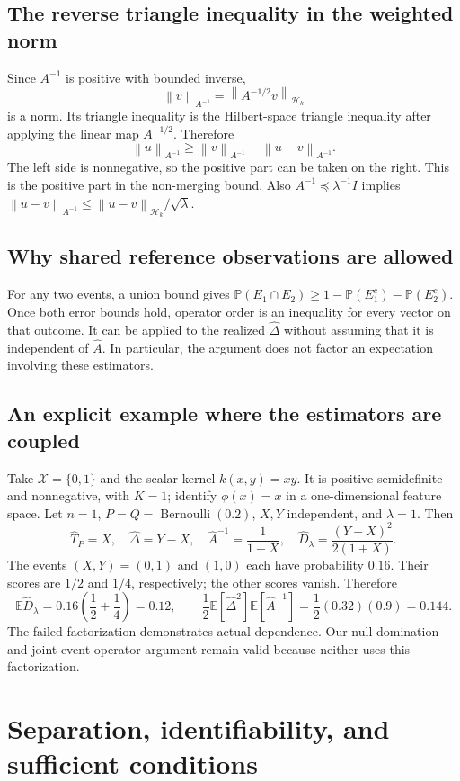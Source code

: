 \documentclass[11pt,a4paper]{article}
\theoremstyle{definition}
\theoremstyle{remark}
\newcommand{\HH}{\mathcal H_k}
\newcommand{\E}{\mathbb E}
\newcommand{\Prob}{\mathbb P}
\newcommand{\norm}[1]{\left\lVert#1\right\rVert}
\newcommand{\Dh}{\widehat D_\lambda}
\begin{document}
\subsection{The reverse triangle inequality in the weighted norm}
Since $A^{-1}$ is positive with bounded inverse,
\[
 \norm{v}_{A^{-1}}=\norm{A^{-1/2}v}_{\HH}
\]
is a norm. Its triangle inequality is the Hilbert-space triangle
inequality after applying the linear map $A^{-1/2}$. Therefore
\[
 \norm{u}_{A^{-1}}\ge
 \norm{v}_{A^{-1}}-\norm{u-v}_{A^{-1}}.
\]
The left side is nonnegative, so the positive part can be taken on
the right. This is the positive part in the non-merging bound.
Also $A^{-1}\preceq\lambda^{-1}I$ implies
$\norm{u-v}_{A^{-1}}\le\norm{u-v}_{\HH}/\sqrt\lambda$.

\subsection{Why shared reference observations are allowed}
For any two events, a union bound gives
$\Prob(E_1\cap E_2)\ge1-\Prob(E_1^c)-\Prob(E_2^c)$.
Once both error bounds hold, operator order is an inequality for every
vector on that outcome. It can be applied to the realized
$\widehat\Delta$ without assuming that it is independent of
$\widehat A$. In particular, the argument does not factor an
expectation involving these estimators.

\subsection{An explicit example where the estimators are coupled}
Take $\mathcal X=\{0,1\}$ and the scalar kernel $k(x,y)=xy$.
It is positive semidefinite and nonnegative, with $K=1$; identify
$\phi(x)=x$ in a one-dimensional feature space. Let $n=1$,
$P=Q=\operatorname{Bernoulli}(0.2)$, $X,Y$ independent, and
$\lambda=1$. Then
\[
 \widehat T_P=X,\quad \widehat\Delta=Y-X,\quad
 \widehat A^{-1}=\frac1{1+X},\quad
 \Dh=\frac{(Y-X)^2}{2(1+X)}.
\]
The events $(X,Y)=(0,1)$ and $(1,0)$ each have probability $0.16$.
Their scores are $1/2$ and $1/4$, respectively; the other scores vanish.
Therefore
\[
 \E\Dh=0.16\left(\frac12+\frac14\right)=0.12,
 \qquad
 \frac12\E[\widehat\Delta^2]\E[\widehat A^{-1}]
 =\frac12(0.32)(0.9)=0.144.
\]
The failed factorization demonstrates actual dependence. Our null
domination and joint-event operator argument remain valid because
neither uses this factorization.

\section{Separation, identifiability, and sufficient conditions}
\label{app:separation}
\end{document}
